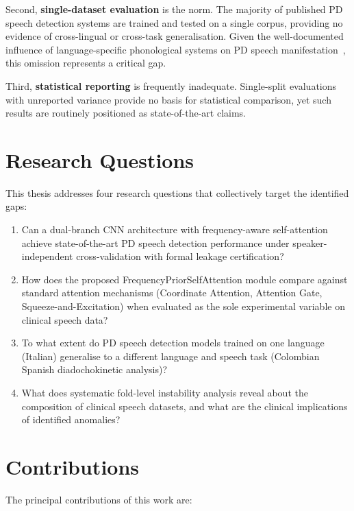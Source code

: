 \documentclass[oneside,openany]{final_report}
\begin{document}
Second, \textbf{single-dataset evaluation} is the norm. The majority of published PD speech detection systems are trained and tested on a single corpus, providing no evidence of cross-lingual or cross-task generalisation. Given the well-documented influence of language-specific phonological systems on PD speech manifestation~\cite{orozco2016}, this omission represents a critical gap.

Third, \textbf{statistical reporting} is frequently inadequate. Single-split evaluations with unreported variance provide no basis for statistical comparison, yet such results are routinely positioned as state-of-the-art claims.

\section{Research Questions}

This thesis addresses four research questions that collectively target the identified gaps:

\begin{enumerate}[label=\textbf{RQ\arabic*:}]
    \item Can a dual-branch CNN architecture with frequency-aware self-attention achieve state-of-the-art PD speech detection performance under speaker-independent cross-validation with formal leakage certification?
    \item How does the proposed FrequencyPriorSelfAttention module compare against standard attention mechanisms (Coordinate Attention, Attention Gate, Squeeze-and-Excitation) when evaluated as the sole experimental variable on clinical speech data?
    \item To what extent do PD speech detection models trained on one language (Italian) generalise to a different language and speech task (Colombian Spanish diadochokinetic analysis)?
    \item What does systematic fold-level instability analysis reveal about the composition of clinical speech datasets, and what are the clinical implications of identified anomalies?
\end{enumerate}

\section{Contributions}

The principal contributions of this work are:
\end{document}
